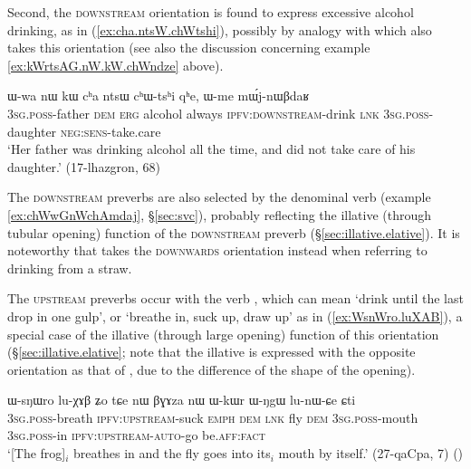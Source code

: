 Second, the \textsc{downstream} orientation is found to express excessive alcohol drinking, as in (\ref{ex:cha.ntsW.chWtshi}), possibly by analogy with  which also takes this orientation (see also the discussion concerning example \ref{ex:kWrtsAG.nW.kW.chWndze} above).

\begin{exe}
\ex \label{ex:cha.ntsW.chWtshi}
\gll  ɯ-wa nɯ kɯ cʰa ntsɯ cʰɯ-tsʰi qʰe, ɯ-me mɯ́j-nɯβdaʁ \\
\textsc{3sg}.\textsc{poss}-father \textsc{dem} \textsc{erg} alcohol always \textsc{ipfv}:\textsc{downstream}-drink \textsc{lnk} \textsc{3sg}.\textsc{poss}-daughter \textsc{neg}:\textsc{sens}-take.care \\
\glt `Her father was drinking alcohol all the time, and did not take care of his daughter.' (17-lhazgron, 68)
\end{exe}

The \textsc{downstream} preverbs are also selected by the denominal verb  (example \ref{ex:chWwGnWchAmdaj}, §\ref{sec:svc}), probably reflecting the illative (through tubular opening) function of the \textsc{downstream} preverb (§\ref{sec:illative.elative}). It is noteworthy that  takes the \textsc{downwards} orientation instead when referring to drinking from a straw.


The \textsc{upstream} preverbs occur with the verb , which can mean `drink until the last drop in one gulp', or `breathe in, suck up, draw up' as in (\ref{ex:WsnWro.luXAB}), a special case of the illative  (through large opening) function of this orientation (§\ref{sec:illative.elative}; note that the illative is expressed with the opposite orientation as that of , due to the difference of the shape of the opening).

\begin{exe}
\ex \label{ex:WsnWro.luXAB}
\gll ɯ-sŋɯro lu-χɤβ ʑo tɕe nɯ βɣɤza nɯ ɯ-kɯr ɯ-ŋgɯ lu-nɯ-ɕe ɕti \\
\textsc{3sg}.\textsc{poss}-breath \textsc{ipfv}:\textsc{upstream}-suck \textsc{emph} \textsc{dem} \textsc{lnk} fly \textsc{dem} \textsc{3sg}.\textsc{poss}-mouth \textsc{3sg}.\textsc{poss}-in \textsc{ipfv}:\textsc{upstream}-\textsc{auto}-go be.\textsc{aff}:\textsc{fact} \\
\glt `[The frog]$_i$ breathes in and the fly goes into its$_i$ mouth by itself.' (27-qaCpa, 7)
()
\end{exe}

